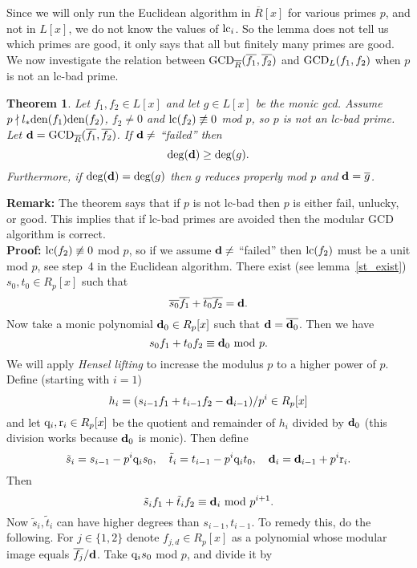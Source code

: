 \documentclass[10pt]{article}
\newcommand{\notdivides}{\nmid}
\newtheorem{theorem}{Theorem}
\newcommand{\x}{x}
\newcommand{\bad}{lc-bad }
\newcommand{\EuclAlg}{{\rm GCD}}
\begin{document}
Since we will only run the Euclidean algorithm in
$\overline{R}[\x]$ for various primes $p$, and not in $L[\x]$,
we do not know the values of ${\rm lc}_i$.
So the lemma does not tell us which primes are good, it only
says that all but finitely many primes are good.
We now investigate the relation between
$\EuclAlg_{\overline{R}}(\overline{f_1},\overline{f_2})$
and $\EuclAlg_{L}(f_1,f_2)$ when $p$ is not an \bad prime.
\begin{theorem}
\label{theorem1}
Let $f_1,f_2 \in L[x]$ and let $g \in L[x]$ be the monic gcd.
Assume $p \notdivides l_* {\rm den}(f_1) {\rm den}(f_2)$, $f_2 \neq 0$
and ${\rm lc}(f_2) \not\equiv 0$ mod $p$, so $p$ is not an \bad prime.
Let ${\bf d} = \EuclAlg_{\overline{R}}(\overline{f_1},\overline{f_2})$.
If ${\bf d} \neq$ ``failed'' then
\[ {\rm deg}({\bf d}) \geq {\rm deg}(g). \]
Furthermore, if ${\rm deg}({\bf d}) = {\rm deg}(g)$ then $g$
reduces properly mod $p$ and ${\bf d} = \overline{g}$.
\end{theorem}
{\bf Remark:} The theorem says that if $p$ is not \bad
then $p$ is either fail, unlucky, or good.
This implies that if \bad primes are avoided then the modular GCD algorithm
is correct. \\[5pt]
{\bf Proof:}
${\rm lc}(f_2) \not\equiv 0$ mod $p$, so if we 
assume ${\bf d} \neq$ ``failed'' 
then ${\rm lc}(f_2)$ must be a unit mod $p$,
see step~4 in the Euclidean algorithm.
There exist (see lemma~\ref{st_exist}) $s_0, t_0 \in R_p[x]$ such that
\[  \overline{s_0} \overline{f_1} + \overline{t_0} \overline{f_2} = {\bf d}.  \]
Now take a monic polynomial ${\bf d}_0 \in R_p[x]$ such
that ${\bf d} = \overline{{\bf d}_0}$. Then we have
\[
	s_0 f_1 + t_0 f_2 \equiv {\bf d}_0 {\rm \ mod \ } p.
\]
We will apply {\em Hensel lifting} to increase the modulus $p$ to a
higher power of $p$.
Define (starting with $i=1$)
\[
  h_i =
	(s_{i-1} f_1 + t_{i-1} f_2 - {\bf d}_{i-1} )/p^i \in R_p[x]
\]
and let ${\bf \rm q}_i, {\bf \rm r}_i \in R_p[x]$ be the quotient
and remainder of $h_i$ divided by ${\bf d}_0$
(this division works because ${\bf d}_0$ is monic).
Then define
\[
	\tilde{s}_i = s_{i-1} - p^i {\bf \rm q}_i s_0, \ \ \ 
	\tilde{t}_i = t_{i-1} - p^i {\bf \rm q}_i t_0, \ \ \
	{\bf d}_i = {\bf d}_{i-1} + p^i {\bf \rm r}_i.
\]
Then
\[
	\tilde{s}_i f_1 + \tilde{t}_i f_2 \equiv {\bf d}_i {\rm \ mod \ } p^{i+1}.
\]
Now $\tilde{s}_i,\tilde{t}_i$ can have higher degrees than $s_{i-1},t_{i-1}$.
To remedy this, do the following.
For $j\in \{1,2\}$ denote $f_{j,d} \in R_p[x]$ as a polynomial whose modular
image equals $\overline{f_j}/{\bf d}$.
Take ${\bf \rm q}_i s_0$ mod $p$, and divide it by
\end{document}
